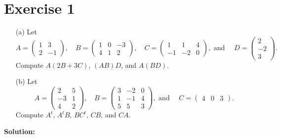 \documentclass{article}
\begin{document}
\section*{Exercise 1}
\begin{enumerate}
\item[(a)] Let
$$A = \begin{pmatrix} 1 & 3 \\ 2 & -1 \end{pmatrix}, \quad B = \begin{pmatrix} 1 & 0 & -3 \\ 4 & 1 & 2 \end{pmatrix}, \quad C = \begin{pmatrix} 1 & 1 & 4 \\ -1 & -2 & 0 \end{pmatrix}, \text{ and } \quad D = \begin{pmatrix} 2 \\ -2 \\ 3 \end{pmatrix}.$$
Compute $A(2B + 3C)$, $(AB)D$, and $A(BD)$.
\item[(b)] Let
$$A = \begin{pmatrix} 2 & 5 \\ -3 & 1 \\ 4 & 2 \end{pmatrix}, \quad B = \begin{pmatrix} 3 & -2 & 0 \\ 1 & -1 & 4 \\ 5 & 5 & 3 \end{pmatrix}, \text{ and } \quad C = \begin{pmatrix} 4 & 0 & 3 \end{pmatrix}.$$
Compute $A^t$, $A^tB$, $BC^t$, $CB$, and $CA$.
\end{enumerate}

\textbf{Solution: } \\
\end{document}
